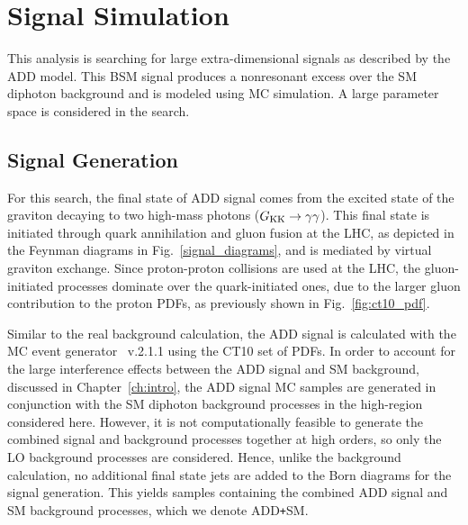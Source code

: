 \chapter{Signal Simulation}\label{ch:signal}

This analysis is searching for large extra-dimensional signals as described by the ADD model. This BSM signal produces a nonresonant excess over the SM diphoton background and is modeled using MC simulation. A large parameter space is considered in the search.

\section{Signal Generation}\label{sec:ADD_gen}

For this search, the final state of ADD signal comes from the excited state of the \KK graviton decaying to two high-mass photons ($G_{\rm KK} \to \gamma\gamma$). This final state is initiated through quark annihilation and gluon fusion at the LHC, as depicted in the Feynman diagrams in Fig.~\ref{signal_diagrams}, and is mediated by virtual graviton exchange. Since proton-proton collisions are used at the LHC, the gluon-initiated processes dominate over the quark-initiated ones, due to the larger gluon contribution to the proton PDFs, as previously shown in Fig.~\ref{fig:ct10_pdf}.

Similar to the real background calculation, the ADD signal is calculated with the MC event generator \SHERPA~v.2.1.1 using the CT10 set of PDFs. In order to account for the large interference effects between the ADD signal and SM background, discussed in Chapter~\ref{ch:intro}, the ADD signal MC samples are generated in conjunction with the SM diphoton background processes in the high-\Mgg region considered here. However, it is not computationally feasible to generate the combined signal and background processes together at high orders, so only the LO background processes are considered. Hence, unlike the background calculation, no additional final state jets are added to the Born diagrams for the signal generation. This yields samples containing the combined ADD signal and SM background processes, which we denote ADD\texttt{+}SM. 

